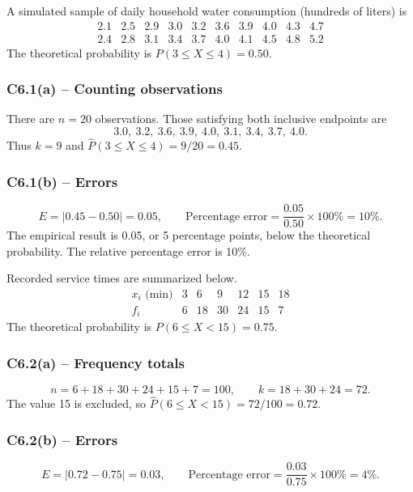 {
A simulated sample of daily household water consumption (hundreds of liters) is
\[
\begin{array}{cccccccccc}
2.1&2.5&2.9&3.0&3.2&3.6&3.9&4.0&4.3&4.7\\
2.4&2.8&3.1&3.4&3.7&4.0&4.1&4.5&4.8&5.2
\end{array}
\]
The theoretical probability is $P(3\le X\le4)=0.50$.
\label{sol:c6-1a}
\subsubsection*{C6.1(a) -- Counting observations }
There are $n=20$ observations. Those satisfying both inclusive endpoints are
\[
3.0,\ 3.2,\ 3.6,\ 3.9,\ 4.0,\ 3.1,\ 3.4,\ 3.7,\ 4.0.
\]
Thus $k=9$ and $\widehat P(3\le X\le4)=9/20=0.45$.
\label{sol:c6-1b}
\subsubsection*{C6.1(b) -- Errors }
\[
E=|0.45-0.50|=0.05,\qquad
\text{Percentage error}=\frac{0.05}{0.50}\times100\%=10\%.
\]
The empirical result is 0.05, or 5 percentage points, below the theoretical
probability. The relative percentage error is 10\%.
\secInicio[sec:c6-1]
}

{
Recorded service times are summarized below.
\[
\begin{array}{c|rrrrrr}
 x_i\text{ (min)}&3&6&9&12&15&18\\\hline
 f_i&6&18&30&24&15&7
\end{array}
\]
The theoretical probability is $P(6\le X<15)=0.75$.
\label{sol:c6-2a}
\subsubsection*{C6.2(a) -- Frequency totals }
\[
n=6+18+30+24+15+7=100,\qquad k=18+30+24=72.
\]
The value 15 is excluded, so $\widehat P(6\le X<15)=72/100=0.72$.
\label{sol:c6-2b}
\subsubsection*{C6.2(b) -- Errors }
\[
E=|0.72-0.75|=0.03,\qquad
\text{Percentage error}=\frac{0.03}{0.75}\times100\%=4\%.
\]
\secInicio[sec:c6-2]
}


